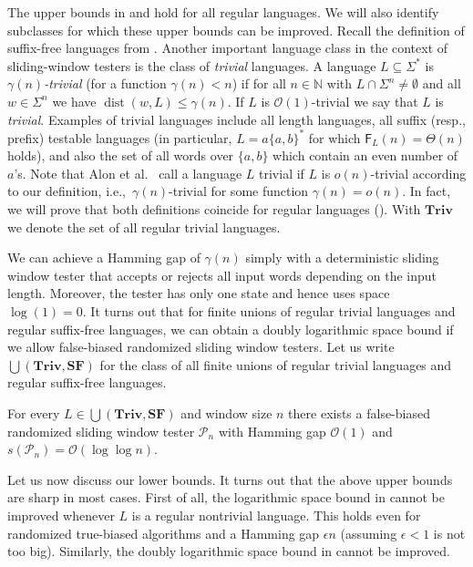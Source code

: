 \documentclass{theoretics}
\newcommand{\N}{\mathbb{N}}
\renewcommand{\O}{\mathcal{O}}
\renewcommand{\P}{\mathcal{P}}
\newcommand{\F}{\mathsf{F}}
\DeclareMathOperator{\dist}{dist}
\newcommand{\Triv}{\mathbf{Triv}}
\newcommand{\SF}{\mathbf{SF}}
\renewcommand{\leq}{\leqslant}
\renewcommand{\le}{\leq}
\begin{document}
The upper bounds in  and  hold for all regular languages.
We will also identify subclasses for which these upper bounds can be improved. Recall the definition of suffix-free languages from 
. Another important language class in the context of sliding-window testers is the class of {\em trivial} languages.
A language $L \subseteq \Sigma^*$ is {\em $\gamma(n)$-trivial} (for a function $\gamma(n)<n$)
if for all $n \in \N$ with $L \cap \Sigma^n \neq \emptyset$
and all $w \in \Sigma^n$ we have $\dist(w,L) \le \gamma(n)$.
If $L$ is $\O(1)$-trivial we say that $L$ is {\em trivial}. 
Examples of trivial languages include all length languages, all suffix (resp., prefix) testable languages (in particular, $L = a \{a,b\}^*$ for which 
$\F_L(n) = \Theta(n)$ holds),
and also the set  of all words over $\{a,b\}$ which contain an even number of $a$'s. 
Note that Alon et al.~\cite{AlonKNS00} call a language $L$ trivial
if $L$ is $o(n)$-trivial according to our definition,
i.e.,~$\gamma(n)$-trivial for some function $\gamma(n) = o(n)$.
In fact, we will prove that both definitions coincide for regular languages ().
With $\Triv$ we denote the set of all  regular trivial languages.

We can achieve a Hamming gap of $\gamma(n)$ simply with a deterministic sliding window tester that accepts or rejects all input words depending on the input length.
Moreover, the tester has only one state and hence
uses space $\log(1) = 0$. It turns out that
for finite unions of regular trivial languages and regular suffix-free languages, we can obtain a doubly logarithmic space
 bound if we allow false-biased randomized sliding window testers. Let us write $\bigcup(\Triv, \SF)$ for the class
 of all finite unions of regular trivial languages and regular suffix-free languages.
 
 
\begin{theorem}
	\label{thm:false-biased}
	For every $L \in \bigcup(\Triv, \SF)$ and window size $n$ there exists a false-biased randomized sliding window tester $\P_n$
	with Hamming gap $\O(1)$ and $s(\P_n) = \O(\log \log n)$.
\end{theorem}


Let us now discuss our lower bounds. It turns out that the above upper bounds are sharp in most cases.
First of all, the logarithmic space bound in  cannot be improved
whenever $L$ is a regular nontrivial language. This holds even for randomized true-biased algorithms and a Hamming gap $\epsilon n$ (assuming $\epsilon<1$ is not too big).
Similarly, the doubly logarithmic space bound in  cannot be improved.
\end{document}

